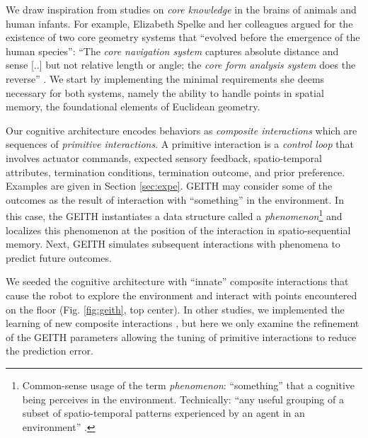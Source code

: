 \documentclass[runningheads]{llncs}
\begin{document}
We draw inspiration from studies on \textit{core knowledge} in the brains of animals and human infants. 
For example, Elizabeth Spelke and her colleagues argued for the existence of two core geometry systems that ``evolved before the emergence of the human species'':  
``The \textit{core navigation system} captures absolute distance and sense [..] but not relative length or angle; the \textit{core form analysis system} does the reverse'' \cite[p. 2789]{spelke_core_2012}.
We start by implementing the minimal requirements she deems necessary for both systems, namely the ability to handle points in spatial memory, the foundational elements of Euclidean geometry. 

Our cognitive architecture encodes behaviors as \textit{composite interactions} which are sequences of \textit{primitive interactions}.
A primitive interaction is a \textit{control loop} that involves actuator commands, expected sensory feedback, spatio-temporal attributes, termination conditions, termination outcome, and prior preference. 
Examples are given in Section \ref{sec:expe}. 
 GEITH may consider some of the outcomes as the result of interaction with ``something'' in the environment.
In this case, the GEITH instantiates a data structure called a \textit{phenomenon}\footnote{Common-sense usage of the term \textit{phenomenon}: ``something'' that a cognitive being perceives in the environment. Technically: ``any useful grouping of a subset of spatio-temporal patterns experienced by an agent in an environment'' \cite[p. 8]{thorisson_explanation_2021}.} and localizes this phenomenon at the position of the interaction in spatio-sequential memory.
Next, GEITH simulates subsequent interactions with phenomena to predict future outcomes. 

We seeded the cognitive architecture with ``innate'' composite interactions that cause the robot to explore the environment and interact with points encountered on the floor (Fig. \ref{fig:geith}, top center). 
In other studies, we implemented the learning of new composite interactions \cite{georgeon_cash_2019}, but here we only examine the refinement of the GEITH parameters allowing the tuning of primitive interactions to reduce the prediction error.
\end{document}
